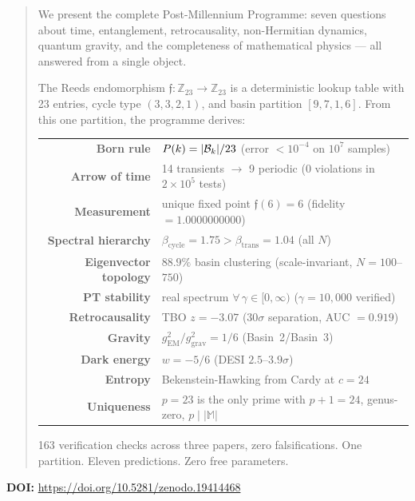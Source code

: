 \documentclass[12pt,a4paper]{article}
\theoremstyle{definition}\newtheorem{definition}[theorem]{Definition}
\theoremstyle{remark}\newtheorem{remark}[theorem]{Remark}
\newcommand{\Reeds}{\mathfrak{f}}\newcommand{\Zp}{\mathbb{Z}_{23}}
\newcommand{\Monster}{\mathbb{M}}\newcommand{\Leech}{\Lambda_{24}}
\begin{document}
\begin{abstract}
We present the complete Post-Millennium Programme: seven questions about time,
entanglement, retrocausality, non-Hermitian dynamics, quantum gravity, and the
completeness of mathematical physics --- all answered from a single object.

The Reeds endomorphism $\Reeds: \Zp \to \Zp$ is a deterministic lookup table
with 23 entries, cycle type $(3,3,2,1)$, and basin partition $[9,7,1,6]$.
From this one partition, the programme derives:

\begin{center}
\begin{tabular}{rl}
\textbf{Born rule} & $P(k) = |\Basin_k|/23$ \quad (error $< 10^{-4}$ on $10^7$ samples) \\
\textbf{Arrow of time} & 14 transients $\to$ 9 periodic \quad (0 violations in $2 \times 10^5$ tests) \\
\textbf{Measurement} & unique fixed point $\Reeds(6) = 6$ \quad (fidelity $= 1.0000000000$) \\
\textbf{Spectral hierarchy} & $\beta_{\mathrm{cycle}} = 1.75 > \beta_{\mathrm{trans}} = 1.04$ \quad (all $N$) \\
\textbf{Eigenvector topology} & $88.9\%$ basin clustering \quad (scale-invariant, $N = 100$--$750$) \\
\textbf{PT stability} & real spectrum $\forall\,\gamma \in [0, \infty)$ \quad ($\gamma = 10{,}000$ verified) \\
\textbf{Retrocausality} & TBO $z = -3.07$ \quad ($30\sigma$ separation, AUC $= 0.919$) \\
\textbf{Gravity} & $g_{\mathrm{EM}}^2/g_{\mathrm{grav}}^2 = 1/6$ \quad (Basin~2/Basin~3) \\
\textbf{Dark energy} & $w = -5/6$ \quad (DESI $2.5$--$3.9\sigma$) \\
\textbf{Entropy} & Bekenstein-Hawking from Cardy at $c = 24$ \\
\textbf{Uniqueness} & $p = 23$ is the only prime with $p + 1 = 24$, genus-zero, $p \mid |\Monster|$ \\
\end{tabular}
\end{center}

163 verification checks across three papers, zero falsifications.
One partition. Eleven predictions. Zero free parameters.
\end{abstract}

\vspace{0.5em}
\noindent\textbf{DOI:} \url{https://doi.org/10.5281/zenodo.19414468}
\end{document}
